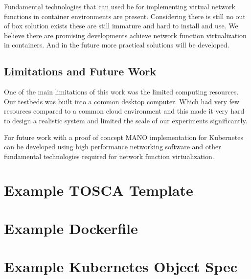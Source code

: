 \documentclass[12pt,oneandhalf,chaparabic,ceng,ms,eng,oneside,pntc]{gsufbe}
\begin{document}
Fundamental technologies that can used be for implementing virtual network functions in
container environments are present.  Considering there is still no out of box solution exists these are
still immature and hard to install and use.  We believe there are promising developments achieve network
function virtualization in containers.  And in the future more practical solutions will be developed.

\section{Limitations and Future Work}
One of the main limitations of this work was the limited computing resources.  Our testbeds was 
built into a common desktop computer.  Which had very few resources compared to a common cloud
environment and this made it very hard to design a realistic system and limited the scale of our
experiments significantly. 

For future work with a proof of concept MANO implementation for Kubernetes can be developed using high
performance networking software and other fundamental technologies required for network function
virtualization.




\appendix
\lstset{%
   breaklines=true,
}
\thispagestyle{empty}
\chapter[]{Example TOSCA Template}
\thispagestyle{empty}
\label{appendix:tosca}

\newpage


\chapter[]{Example Dockerfile}
\thispagestyle{empty}
\label{appendix:docker}


\chapter[]{Example Kubernetes Object Spec}
\thispagestyle{empty}
\label{appendix:k8spec}

\newpage




\thispagestyle{empty}
\end{document}
